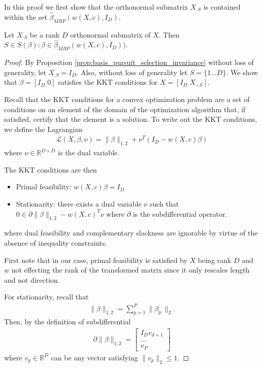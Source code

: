 In this proof we first show that the orthonormal submatrix $X_{.S}$ is contained within the set $\widehat { \mathcal \beta}_{MBP} (w(X,c), I_D)$.

\begin{proposition}
\label{prop:kkt}
Let $X_{.S}$ be a rank $D$ orthonormal submatrix of $X$.
Then $S \in S(\beta) : \beta \in \widehat{ \mathcal \beta}_{MBP} (w(X,c), I_D))$.
 \end{proposition}
 
 \begin{proof}
 
 By Proposition \ref{prop:basis_pursuit_selection_invariance} without loss of generality, let $X_{.S} = I_D$.
 Also, without loss of generality let $S = \{1 \dotsc D\}$.
 We show that $\beta = [I_D \; 0]$ satisfies the KKT conditions for $X = [I_D \; X_{-S}]$.
 
Recall that the KKT conditions for a convex optimization problem are a set of conditions on an element of the domain of the optimization algorithm that, if satisfied, certify that the element is a solution.
To write out the KKT conditions, we define the Lagrangian
\begin{align}
\mathcal L(X,\beta,\nu) = \|\beta\|_{1,2} + \nu^T (I_D - w(X,c) \beta)
\end{align}
where $\nu \in \mathbb R^{D\times D}$ is the dual variable.

The KKT conditions are then
\begin{itemize}
\item Primal feasibility: $w(X, c) \beta = I_D$
\item Stationarity: there exists a dual variable $\nu$ such that $0 \in \partial \|\beta\|_{1,2} - w(X, c)^T \nu$  where $\partial$ is the subdifferential operator.
\end{itemize}
where dual feasibility and complementary slackness are ignorable by virtue of the absence of inequality constraints.

First note that in our case, primal feasibility is satisfied by $X$ being rank $D$ and $w$ not effecting the rank of the transformed matrix since it only rescales length and not direction.

For stationarity, recall that 
\begin{align}
\|\beta\|_{1,2} = \sum_{p = 1}^P \|\beta_{p.}\|_2.
\end{align}
Then, by the definition of subdifferential
\begin{align}
\partial \|\beta\|_{1,2} = \begin{bmatrix}
I_D
v_{d+1} \\
\dotsc \\
v_P
\end{bmatrix}
\end{align}
where $v_p \in \mathbb R^{D}$ can be any vector satisfying $\|v_p\|_2 \leq 1$.


\end{proof}
